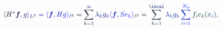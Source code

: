 \documentclass[12pt]{article}
\begin{document}
\makeatletter
\renewcommand*{\@textcolor}[3]{%
  \protect\leavevmode
  \begingroup
    \color#1{#2}#3%
  \endgroup
}
\makeatother
\begin{displaymath}
\mathcolor[RGB]{0,0,15}{\langle} \mathcolor[RGB]{0,0,30}{H} ^ { \mathcolor[RGB]{0,0,45}{*} } \boldsymbol { \mathcolor[RGB]{0,0,60}{f} } \mathcolor[RGB]{0,0,75}{,} \mathcolor[RGB]{0,0,90}{g} \mathcolor[RGB]{0,0,105}{\rangle} _ { \mathcolor[RGB]{0,0,120}{L} ^ { \mathcolor[RGB]{0,0,135}{2} } } \mathcolor[RGB]{0,0,150}{=} \mathcolor[RGB]{0,0,165}{\langle} \boldsymbol { \mathcolor[RGB]{0,0,180}{f} } \mathcolor[RGB]{0,0,195}{,} \mathcolor[RGB]{0,0,210}{H} \mathcolor[RGB]{0,0,225}{g} \mathcolor[RGB]{0,0,240}{\rangle} _ { \mathcolor[RGB]{0,0,255}{\ell} ^ { \mathcolor[RGB]{0,15,0}{2} } } \mathcolor[RGB]{0,15,15}{=} \mathcolor[RGB]{0,15,30}{\sum} _ { \mathcolor[RGB]{0,15,45}{k} \mathcolor[RGB]{0,15,60}{=} \mathcolor[RGB]{0,15,75}{1} } ^ { \mathcolor[RGB]{0,15,90}{\infty} } \mathcolor[RGB]{0,15,105}{\lambda} _ { \mathcolor[RGB]{0,15,120}{k} } \mathcolor[RGB]{0,15,135}{g} _ { \mathcolor[RGB]{0,15,150}{k} } \mathcolor[RGB]{0,15,165}{\langle} \boldsymbol { \mathcolor[RGB]{0,15,180}{f} } \mathcolor[RGB]{0,15,195}{,} \mathcolor[RGB]{0,15,210}{S} \mathcolor[RGB]{0,15,225}{e} _ { \mathcolor[RGB]{0,15,240}{k} } \mathcolor[RGB]{0,15,255}{\rangle} _ { \mathcolor[RGB]{0,30,0}{\ell} ^ { \mathcolor[RGB]{0,30,15}{2} } } \mathcolor[RGB]{0,30,30}{=} \mathcolor[RGB]{0,30,45}{\sum} _ { \mathcolor[RGB]{0,30,60}{k} \mathcolor[RGB]{0,30,75}{=} \mathcolor[RGB]{0,30,90}{1} } ^ { \mathcolor[RGB]{0,30,105}{\incal} } \mathcolor[RGB]{0,30,120}{\lambda} _ { \mathcolor[RGB]{0,30,135}{k} } \mathcolor[RGB]{0,30,150}{g} _ { \mathcolor[RGB]{0,30,165}{k} } \mathcolor[RGB]{0,30,180}{\sum} _ { \mathcolor[RGB]{0,30,195}{i} \mathcolor[RGB]{0,30,210}{=} \mathcolor[RGB]{0,30,225}{1} } ^ { \mathcolor[RGB]{0,30,240}{N} _ { \mathcolor[RGB]{0,30,255}{d} } } \mathcolor[RGB]{0,45,0}{f} _ { \mathcolor[RGB]{0,45,15}{i} } \mathcolor[RGB]{0,45,30}{e} _ { \mathcolor[RGB]{0,45,45}{k} } \mathcolor[RGB]{0,45,60}{(} \mathcolor[RGB]{0,45,75}{x} _ { \mathcolor[RGB]{0,45,90}{i} } \mathcolor[RGB]{0,45,105}{)} \mathcolor[RGB]{0,45,120}{,}
\end{displaymath}
\end{document}
